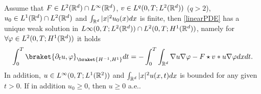 \begin{theorem}\label{lemLPDE}
	Assume that $F\in L^2(\mathbb{R}^d)\cap L^\infty(\mathbb{R}^d)$, $v \in  L^{q}(0,T;L^{2}(\mathbb{R}^d) )$ ($q>2$), $u_0\in L^1(\mathbb{R}^d)\cap L^2(\mathbb{R}^d)$ and $\int_{\mathbb{R}^d}|x|^2u_0(x)dx$ is finite, then \autoref{linearPDE} has a unique weak solution in $L\infty(0,T; L^2(\mathbb{R}^d) )\cap L^{2}(0,T; H^{1}(\mathbb{R}^d) )$, namely for $\forall  \varphi \in  L^{2}(0,T; H^{1}(\mathbb{R}^d) ) $ it holds
	\begin{align*} 
	\int_0^{T}    \braket{\partial_t u , \phi }_{\braket{H^{-1},H^{1}  }} dt = -\int_0^{T} \int_{\mathbb{R}^{d} }   \nabla u \nabla \phi -F \star v * u \nabla \phi   dx dt
	.\end{align*}
   In addition, $u\in L^\infty(0,T;L^1(\mathbb{R}^2))$ and $\int_{\mathbb{R}^d}|x|^2u(x,t)dx$ is bounded for any given $t>0$.	If in addition $u_{0} \ge  0$, then  $u \ge 0$ a.e..
\end{theorem}
